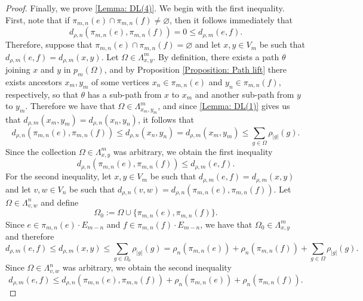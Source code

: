 \documentclass{amsart}
\numberwithin{equation}{section}
\theoremstyle{definition}
\theoremstyle{remark}
\begin{document}
\begin{proof}
    Finally, we prove \ref{Lemma: DL(4)}. We begin with the first inequality. First, note that if \(\pi_{m,n}(e)\cap\pi_{m,n}(f)\neq\varnothing\), then it follows immediately that 
        \[
            d_{\rho,n}(\pi_{m,n}(e),\pi_{m,n}(f))=0\leq d_{\rho,m}(e,f).
        \]
    Therefore, suppose that \(\pi_{m,n}(e)\cap \pi_{m,n}(f)=\varnothing\) and let \(x,y\in V_m\) be such that \(d_{\rho,m}(e,f)= d_{\rho,m}(x,y)\). Let \(\Omega\in \Lambda_{x,y}^m\). By definition, there exists a path \(\theta\) joining \(x\) and \(y\) in \(p_m(\Omega)\), and by Proposition \ref{Proposition: Path lift} there exists ancestors \(x_m,y_m\) of some vertices \(x_n\in \pi_{m,n}(e)\) and \(y_n\in \pi_{m,n}(f)\), respectively, so that \(\theta\) has a sub-path from \(x\) to \(x_m\) and another sub-path from \(y\) to \(y_m\). Therefore we have that \(\Omega\in \Lambda_{x_m,y_m}^m\), and since \ref{Lemma: DL(1)} gives us that \(d_{\rho,m}(x_m,y_m)=d_{\rho,n}(x_n,y_n)\), it follows that
        \begin{equation}
            d_{\rho,n}(\pi_{m,n}(e),\pi_{m,n}(f))\leq d_{\rho,n}(x_n,y_n)= d_{\rho,m}(x_m,y_m)\leq \sum_{g\in \Omega}\rho_{\lvert g \rvert}(g).
        \end{equation}
    Since the collection \(\Omega\in \Lambda_{x,y}^m\) was arbitrary, we obtain the first inequality
        \[
            d_{\rho,n}(\pi_{m,n}(e),\pi_{m,n}(f))\leq d_{\rho,m}(e,f).
        \]
    For the second inequality, let \(x,y\in V_m\) be such that \(d_{\rho,m}(e,f)= d_{\rho,m}(x,y)\) and let \(v,w\in V_n\) be such that \(d_{\rho,n}(v,w)=d_{\rho,n}(\pi_{m,n}(e),\pi_{m,n}(f))\). Let \(\Omega \in \Lambda_{v,w}^n\) and define 
        \[
            \Omega_0:=\Omega\cup\{\pi_{m,n}(e),\pi_{m,n}(f)\}.
        \]
    Since \(e\in \pi_{m,n}(e)\cdot E_{m-n}\) and \(f\in \pi_{m,n}(f)\cdot E_{m-n}\), we have that \(\Omega_0\in\Lambda_{x,y}^m\) and therefore
        \begin{equation}
            d_{\rho,m}(e,f)\leq d_{\rho,m}(x,y)\leq \sum_{g\in\Omega_0}\rho_{\lvert g\rvert}(g)=\rho_n(\pi_{m,n}(e))+\rho_n(\pi_{m,n}(f))+\sum_{g\in \Omega}\rho_{\lvert g \rvert}(g).
        \end{equation}
     Since \(\Omega\in \Lambda_{v,w}^n\) was arbitrary, we obtain the second inequality
        \[
            d_{\rho,m}(e,f)\leq d_{\rho,n}(\pi_{m,n}(e),\pi_{m,n}(f))+\rho_n(\pi_{m,n}(e))+\rho_n(\pi_{m,n}(f)).
        \]
\end{proof}
\end{document}
